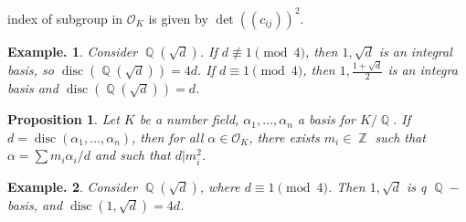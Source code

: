 \documentclass[11pt, a4paper]{memoir}
\DeclareMathOperator{\Q}{{\mathbb{Q}}}
\DeclareMathOperator{\Z}{{\mathbb{Z}}}
\theoremstyle{change}
\newtheorem{proposition}[theorem]{Proposition}
\theoremstyle{plain}
\theoremstyle{nonumberplain}
\newtheorem{example}{Example.}
\DeclareMathOperator{\disc}{disc}
\begin{document}
index of subgroup in $\mathcal{O}_K$ is given by $\det((c_{ij}))^2$.
\begin{example}
    Consider $\Q(\sqrt{d})$.
    If $d\nequiv 1\pmod{4}$, then $1,\sqrt{d}$ is an integral basis, so $\disc(\Q(\sqrt{d}))=4d$.
    If $d\equiv 1\pmod{4}$, then $1,\frac{1+\sqrt{d}}{2}$ is an integra basis and $\disc(\Q(\sqrt{d}))=d$.
\end{example}
\begin{proposition}
    Let $K$ be a number field, $\alpha_1,\ldots,\alpha_n$ a basis for $K/\Q$.
    If $d=\disc(\alpha_1,\ldots,\alpha_n)$, then for all $\alpha\in\mathcal{O}_K$, there exists $m_i\in\Z$ such that $\alpha=\sum m_i\alpha_i/d$ and such that $d|m_i^2$.
\end{proposition}
\begin{example}
    Consider $\Q(\sqrt{d})$, where $d\equiv 1\pmod{4}$.
    Then $1,\sqrt{d}$ is q $\Q-$basis, and $\disc(1,\sqrt{d})=4d$.
\end{example}
\end{document}
